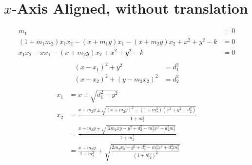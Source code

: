 \documentclass[11pt]{article}
\begin{document}
\section{$x$-Axis Aligned, without translation}
\begin{align*}
  m_1 &= 0\\
  (1 + m_1 m_2) x_1 x_2 - (x + m_1 y) x_1 - (x + m_2 y) x_2 + x^2 + y^2 - k &= 0\\
  x_1 x_2 - x x_1 - (x + m_2 y) x_2 + x^2 + y^2 - k &= 0\\
\end{align*}
\begin{align*}
  (x - x_1)^2 + y^2 & = d_1^2\\
  (x - x_2)^2 + (y - m_2 x_2)^2 & = d_2^2\\
\end{align*}
\begin{align*}
  x_1 &= x \pm \sqrt{d_1^2 - y^2}\\
  x_2 &= \frac{x + m_2 y \pm \sqrt{(x + m_2 y)^2 - (1 + m_2^2)(x^2 + y^2 - d_2^2)}}{1 + m_2^2}\\
  &= \frac{x + m_2 y \pm \sqrt{(2 m_2 x y - y^2 + d_2^2 - m_2^2 x^2 + d_2^2 m_2^2}}{1 + m_2^2}\\
  &= \frac{x + m_2 y}{1 + m_2^2} + \sqrt{\frac{2 m_2 x y - y^2 + d_2^2 - m_2^2 x^2 + d_2^2 m_2^2}{(1 + m_2^2)^2}}
\end{align*}
\end{document}

